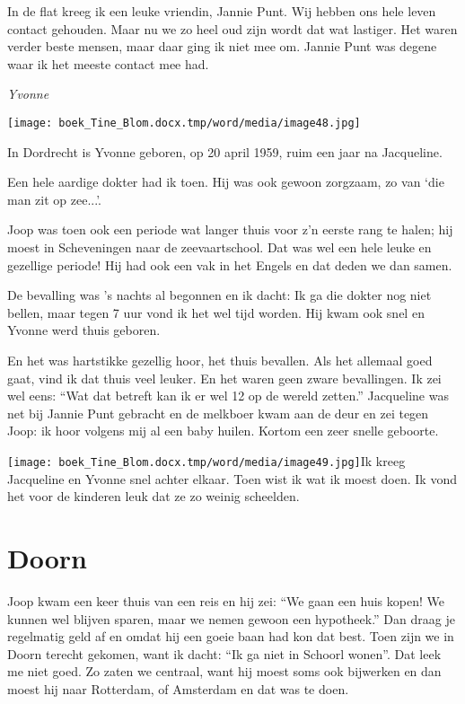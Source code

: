 \documentclass{scrbook}
\begin{document}
{In de flat kreeg ik een leuke vriendin, Jannie Punt. Wij hebben ons hele leven contact gehouden. Maar nu we zo heel oud zijn wordt dat wat lastiger. Het waren verder beste mensen, maar daar ging ik niet mee om. Jannie Punt was degene waar ik het meeste contact mee had.

\textit{Yvonne }



 \texttt{[image: boek\_Tine\_Blom.docx.tmp/word/media/image48.jpg]}

In Dordrecht is Yvonne geboren, op 20 april 1959, ruim een jaar na Jacqueline.

Een hele aardige dokter had ik toen. Hij was ook gewoon zorgzaam, zo van ‘die man zit op zee...’.

Joop was toen ook een periode wat langer thuis voor z’n eerste rang te halen; hij moest in Scheveningen naar de zeevaartschool. Dat was wel een hele leuke en gezellige periode! Hij had ook een vak in het Engels en dat deden we dan samen. 

De bevalling was ’s nachts al begonnen en ik dacht: Ik ga die dokter nog niet bellen, maar tegen 7 uur vond ik het wel tijd worden. Hij kwam ook snel en Yvonne werd thuis geboren. 

En het was hartstikke gezellig hoor, het thuis bevallen. Als het allemaal goed gaat, vind ik dat thuis veel leuker. En het waren geen zware bevallingen. Ik zei wel eens: ``Wat dat betreft kan ik er wel 12 op de wereld zetten.'' Jacqueline was net bij Jannie Punt gebracht en de melkboer kwam aan de deur en zei tegen Joop: ik hoor volgens mij al een baby huilen. Kortom een zeer snelle geboorte.

\texttt{[image: boek\_Tine\_Blom.docx.tmp/word/media/image49.jpg]}Ik kreeg Jacqueline en Yvonne snel achter elkaar. Toen wist ik wat ik moest doen. Ik vond het voor de kinderen leuk dat ze zo weinig scheelden.

\chapter{\label{ref-011}Doorn}

Joop kwam een keer thuis van een reis en hij zei: ``We gaan een huis kopen! We kunnen wel blijven sparen, maar we nemen gewoon een hypotheek.'' Dan draag je regelmatig geld af en omdat hij een goeie baan had kon dat best. Toen zijn we in Doorn terecht gekomen, want ik dacht: ``Ik ga niet in Schoorl wonen''. Dat leek me niet goed. Zo zaten we centraal, want hij moest soms ook bijwerken en dan moest hij naar Rotterdam, of Amsterdam en dat was te doen.

}
\end{document}
